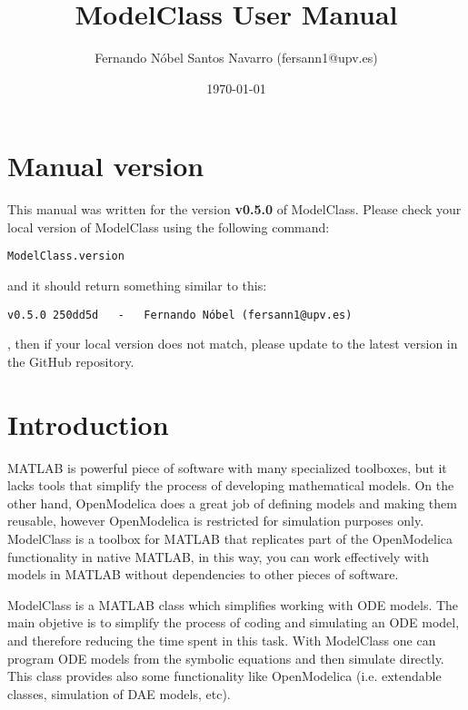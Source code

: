 \documentclass[11pt]{article}
\title{ModelClass User Manual}
\author{Fernando Nóbel Santos Navarro (fersann1@upv.es)}
\date{\today}
\begin{document}
\maketitle

\tableofcontents

\newpage 

\setlength{\parskip}{0.5em}

\section{Manual version}

This manual was written for the version \textbf{ 
v0.5.0
} of ModelClass. Please check your local version of ModelClass using the following command:

\begin{lstlisting}
ModelClass.version
\end{lstlisting}

and it should return something similar to this:

\begin{lstlisting}
v0.5.0 250dd5d   -   Fernando Nóbel (fersann1@upv.es)\end{lstlisting}
, then if your local version does not match, please update to the latest version in the GitHub repository.

\section{Introduction}

MATLAB is powerful piece of software with many specialized toolboxes, but it lacks tools that simplify the process of developing mathematical models.
On the other hand, OpenModelica does a great job of defining models and making them reusable, however OpenModelica is restricted for simulation purposes only.
ModelClass is a toolbox for MATLAB that replicates part of the OpenModelica functionality in native MATLAB, in this way, you can work effectively with models in MATLAB without dependencies to other pieces of software.

ModelClass is a MATLAB class which simplifies working with ODE models. The main objetive is to simplify the process of coding and simulating an ODE model, and therefore reducing the time spent in this task. With ModelClass one can program ODE models from the symbolic equations and then simulate directly. This class provides also some functionality like OpenModelica (i.e. extendable classes, simulation of DAE models, etc).
\end{document}
